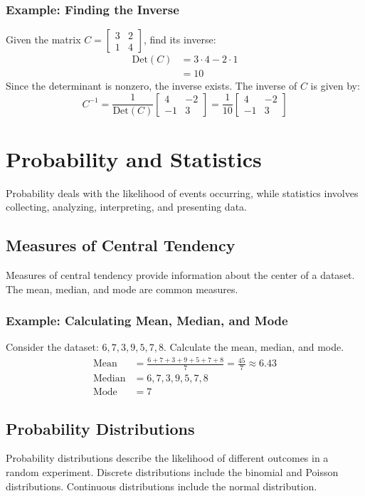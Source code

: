 \documentclass{article}
\begin{document}
\subsubsection{Example: Finding the Inverse}
Given the matrix $C = \begin{bmatrix} 3 & 2 \\ 1 & 4 \end{bmatrix}$, find its inverse:
\begin{align*}
    \text{Det}(C) &= 3 \cdot 4 - 2 \cdot 1 \\
    &= 10
\end{align*}
Since the determinant is nonzero, the inverse exists. The inverse of $C$ is given by:
\[ C^{-1} = \frac{1}{\text{Det}(C)} \begin{bmatrix} 4 & -2 \\ -1 & 3 \end{bmatrix} = \frac{1}{10} \begin{bmatrix} 4 & -2 \\ -1 & 3 \end{bmatrix} \]

\section{Probability and Statistics}
Probability deals with the likelihood of events occurring, while statistics involves collecting, analyzing, interpreting, and presenting data.

\subsection{Measures of Central Tendency}
Measures of central tendency provide information about the center of a dataset. The mean, median, and mode are common measures.

\subsubsection{Example: Calculating Mean, Median, and Mode}
Consider the dataset: $6, 7, 3, 9, 5, 7, 8$. Calculate the mean, median, and mode.
\begin{align*}
    \text{Mean} &= \frac{6 + 7 + 3 + 9 + 5 + 7 + 8}{7} = \frac{45}{7} \approx 6.43 \\
    \text{Median} &= 6, 7, 3, 9, 5, 7, 8 \\
    \text{Mode} &= 7
\end{align*}

\subsection{Probability Distributions}
Probability distributions describe the likelihood of different outcomes in a random experiment. Discrete distributions include the binomial and Poisson distributions. Continuous distributions include the normal distribution.
\end{document}
